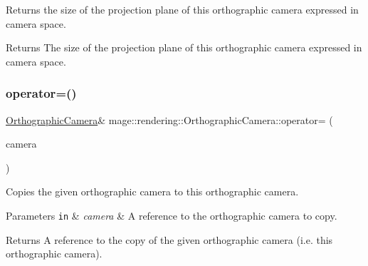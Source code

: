 Returns the size of the projection plane of this orthographic camera expressed in camera space.

\begin{DoxyReturn}{Returns}
The size of the projection plane of this orthographic camera expressed in camera space. 
\end{DoxyReturn}
\hypertarget{classmage_1_1rendering_1_1_orthographic_camera_adcd0a977ed5245aa4224dd1a679586f7}{}\label{classmage_1_1rendering_1_1_orthographic_camera_adcd0a977ed5245aa4224dd1a679586f7} 
\subsubsection{\texorpdfstring{operator=()}{operator=()}\hspace{0.1cm}{\footnotesize\ttfamily [1/2]}}
{\footnotesize\ttfamily \hyperlink{classmage_1_1rendering_1_1_orthographic_camera}{Orthographic\+Camera}\& mage\+::rendering\+::\+Orthographic\+Camera\+::operator= (\begin{DoxyParamCaption}\item[{const \hyperlink{classmage_1_1rendering_1_1_orthographic_camera}{Orthographic\+Camera} \&}]{camera }\end{DoxyParamCaption})\hspace{0.3cm}{\ttfamily [delete]}}

Copies the given orthographic camera to this orthographic camera.


\begin{DoxyParams}[1]{Parameters}
\mbox{\tt in}  & {\em camera} & A reference to the orthographic camera to copy. \\
\hline
\end{DoxyParams}
\begin{DoxyReturn}{Returns}
A reference to the copy of the given orthographic camera (i.\+e. this orthographic camera). 
\end{DoxyReturn}
\hypertarget{classmage_1_1rendering_1_1_orthographic_camera_aa4518e7ef41bc0d841719198ac59d41f}{}\label{classmage_1_1rendering_1_1_orthographic_camera_aa4518e7ef41bc0d841719198ac59d41f} 
